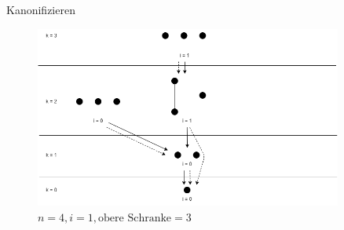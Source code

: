 \begin{frame}{Kanonifizieren}
  \begin{table}[!t]
    \renewcommand{\arraystretch}{1.2}
    \centering
  \end{table}
\end{frame}

\begin{frame}{\insertsection}

  \begin{figure}[!b]
    \centering
    \includegraphics[width=0.9\textwidth,height=0.67\textheight,keepaspectratio]{./figures/backward-searchtree-bound3.png}
    \caption{$n=4,i=1,\text{obere Schranke}=3$}
    \label{fig:backward-searchtree-bound3}
  \end{figure}
\end{frame}

